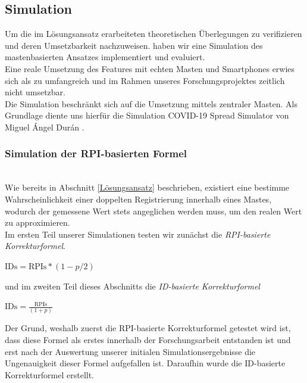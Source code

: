 \documentclass[conference,compsoc]{IEEEtran}
\begin{document}
\subsection{Simulation}

Um die im Lösungsansatz erarbeiteten theoretischen Überlegungen zu verifizieren und deren Umsetzbarkeit nachzuweisen. haben wir eine Simulation des mastenbasierten Ansatzes implementiert und evaluiert.\\
Eine reale Umsetzung des Features mit echten Masten und Smartphones erwies sich als zu umfangreich und im Rahmen unseres Forschungsprojektes zeitlich nicht umsetzbar.\\
Die Simulation beschränkt sich auf die Umsetzung mittels zentraler Masten. Als Grundlage diente uns hierfür die Simulation \glqq COVID-19 Spread Simulator \grqq von Miguel Ángel Durán \cite{Simulation}.
\subsubsection{Simulation der RPI-basierten Formel}
\text{}\\
Wie bereits in Abschnitt \ref{Lösungsansatz} beschrieben, existiert eine bestimme Wahrscheinlichkeit einer doppelten Registrierung innerhalb eines Mastes, wodurch der gemessene Wert stets angeglichen werden muss, um den realen Wert zu approximieren.\\
Im ersten Teil unserer Simulationen testen wir zunächst die \textit{RPI-basierte Korrekturformel}.\\
\centerline{$\text{IDs} = \text{RPIs} * (1-p/2)$}
und im zweiten Teil dieses Abschnitts die \textit{ID-basierte Korrekturformel}
\centerline{$\text{IDs} = \frac{\text{RPIs}}{(1+p)}$}
Der Grund, weshalb zuerst die RPI-basierte Korrekturformel getestet wird ist, dass diese Formel als erstes innerhalb der Forschungsarbeit entstanden ist und erst nach der Auswertung unserer initialen Simulationsergebnisse die Ungenauigkeit dieser Formel aufgefallen ist.
Daraufhin wurde die ID-basierte Korrekturformel erstellt. 
\end{document}
